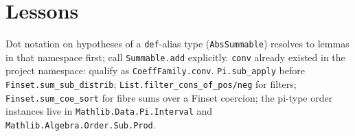 \documentclass[11pt]{article}
\begin{document}
\section{Lessons}
Dot notation on hypotheses of a \texttt{def}-alias type (\texttt{AbsSummable}) resolves to lemmas in
that namespace first; call \texttt{Summable.add} explicitly. \texttt{conv} already existed in the
project namespace: qualify as \texttt{CoeffFamily.conv}. \texttt{Pi.sub\_apply} before
\texttt{Finset.sum\_sub\_distrib}; \texttt{List.filter\_cons\_of\_pos/neg} for filters;
\texttt{Finset.sum\_coe\_sort} for fibre sums over a Finset coercion; the pi-type order instances
live in \texttt{Mathlib.Data.Pi.Interval} and \texttt{Mathlib.Algebra.Order.Sub.Prod}.
\end{document}
